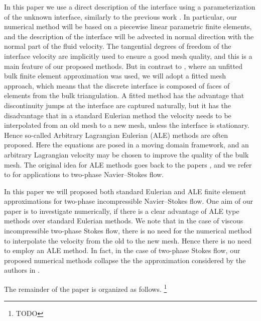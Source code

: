 \documentclass[a4paper,12pt,onecolumn]{article}
\begin{document}
In this paper we use a direct description of the interface using a
parameterization of the unknown interface, similarly to the previous work
\cite{fluidfbp}. In particular, our numerical method will be based
on a piecewise linear parametric finite elements, and the description of the
interface will be advected in normal direction
with the normal part of the fluid velocity. The tangential degrees
of freedom of the interface velocity are implicitly used to ensure a
good mesh quality, and this is a main feature of our proposed methods.
But in contrast to \cite{fluidfbp}, where an unfitted bulk finite element
approximation was used, we will adopt a fitted mesh approach, which means
that the discrete interface is composed of faces of elements from the bulk
triangulation. A fitted method has the advantage that discontinuity jumps
at the interface are captured naturally, but it has the disadvantage that in
a standard Eulerian method the velocity needs to be interpolated from
an old mesh to a new mesh, unless the interface is stationary. Hence so-called
Arbitrary Lagrangian Eulerian (ALE) methods are often proposed. Here
the equations are posed in a moving domain framework,
and an arbitrary Lagrangian velocity may be chosen to improve the quality of
the bulk mesh. The original idea for ALE methods goes back to
the papers \cite{Donea83,Hughes81}, and we refer to
\cite{Nobile99,NobilePhd,Formaggia04,Ganesan06,GanesanT08} for applications
to two-phase Navier--Stokes flow.

In this paper we will proposed both standard Eulerian and
ALE finite element approximations for two-phase incompressible Navier--Stokes
flow. One aim of our paper is to investigate numerically, if there is a clear
advantage of ALE type methods over standard Eulerian methods.
We note that in the case of viscous incompressible two-phase Stokes flow,
there is no need for the numerical method to interpolate the velocity from the
old to the new mesh. Hence there is no need to employ an ALE method. In fact,
in the case of two-phase Stokes flow, our proposed numerical methods collapse
the the approximation considered by the authors in
\cite{stokesfitted}.



The remainder of the paper is organized as follows.
\footnote{TODO}
\end{document}
